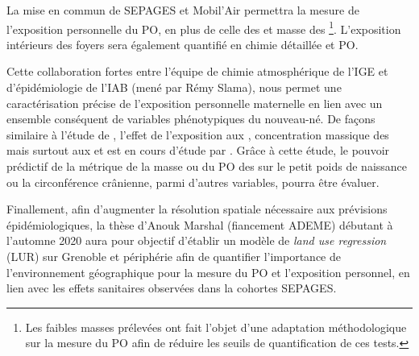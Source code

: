 La mise en commun de SEPAGES et Mobil'Air permettra la mesure de l'exposition personnelle
du PO, en plus de celle des  et masse des \PMdc\footnote{Les faibles masses
    prélevées ont fait l'objet d'une adaptation méthodologique sur la mesure du PO afin de
    réduire les seuils de quantification de ces tests.}.
L'exposition intérieurs des foyers sera également quantifié en chimie détaillée et PO.

Cette collaboration fortes entre l'équipe de chimie atmosphérique de l'IGE et
d'épidémiologie de l'IAB (mené par Rémy Slama), nous permet une caractérisation précise de
l'exposition personnelle maternelle en lien avec un ensemble conséquent de variables
phénotypiques du nouveau-né.
De façons similaire à l'étude de \cite{ouidirEstimation2015}, l'effet de l'exposition aux
, concentration massique des \PMdc mais surtout aux \POAAv{} et \PODTTv{} est en
cours d'étude par \cite{borlazaPersonalinprep.}.
Grâce à cette étude, le pouvoir prédictif de la métrique de la masse ou du PO des \PMdc{}
sur le petit poids de naissance ou la circonférence crânienne, parmi d'autres variables,
pourra être évaluer.

Finallement, afin d'augmenter la résolution spatiale nécessaire aux prévisions
épidémiologiques, la thèse d'Anouk Marshal (fiancement ADEME) débutant à l'automne 2020
aura pour objectif d'établir un modèle de \textit{land use regression} (LUR) sur Grenoble
et périphérie afin de quantifier l'importance de l'environnement géographique pour la
mesure du PO et l'exposition personnel, en lien avec les effets sanitaires observées dans
la cohortes SEPAGES.

%


